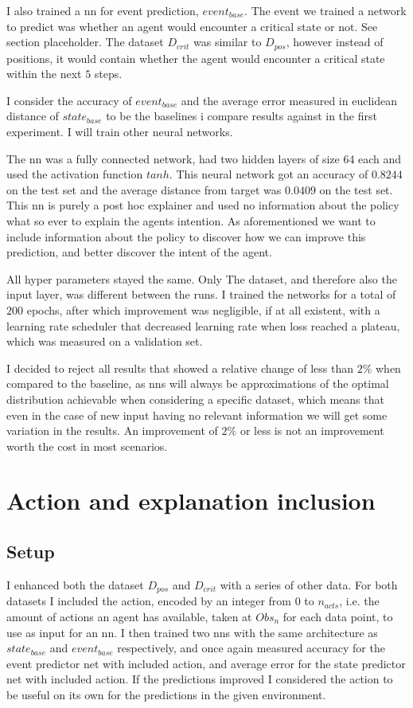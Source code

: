 \documentclass[UKenglish]{uiomasterthesis}
\begin{document}
I also trained a \ac{nn} for event prediction, $event_{base}$. The event we trained a network to predict was whether an agent would encounter a critical state or not. See section placeholder. The dataset $D_{crit}$ was similar to $D_{pos}$, however instead of positions, it would contain whether the agent would encounter a critical state within the next $5$ steps. 

I consider the accuracy of $event_{base}$ and the average error measured in euclidean distance of $state_{base}$ to be the baselines i compare results against in the first experiment. I will train other neural networks.

The \ac{nn} was a fully connected network, had two hidden layers of size 64 each and used the activation function $tanh$. This neural network got an accuracy of $0.8244$ on the test set and the average distance from target was $0.0409$ on the test set. This \ac{nn} is purely a post hoc explainer and used no information about the policy what so ever to explain the agents intention. As aforementioned we want to include information about the policy to discover how we can improve this prediction, and better discover the intent of the agent.

All hyper parameters stayed the same. Only The dataset, and therefore also the input layer, was different between the runs. I trained the networks for a total of $200$ epochs, after which improvement was negligible, if at all existent, with a learning rate scheduler that decreased learning rate when loss reached a plateau, which was measured on a validation set.

I decided to reject all results that showed a relative change of less than $2\%$ when compared to the baseline, as \acp{nn} will always be approximations of the optimal distribution achievable when considering a specific dataset, which means that even in the case of new input having no relevant information we will get some variation in the results. An improvement of $2\%$ or less is not an improvement worth the cost in most scenarios.

\section{Action and explanation inclusion}
\subsection{Setup}
I enhanced both the dataset $D_{pos}$ and $D_{crit}$ with a series of other data. For both datasets I included the action, encoded by an integer from $0$ to $n_{acts}$, i.e. the amount of actions an agent has available, taken at $Obs_n$ for each data point, to use as input for an \ac{nn}. I then trained two \acp{nn} with the same architecture as $state_{base}$ and $event_{base}$ respectively, and once again measured accuracy for the event predictor net with included action, and average error for the state predictor net with included action. If the predictions improved I considered the action to be useful on its own for the predictions in the given environment.
\end{document}
